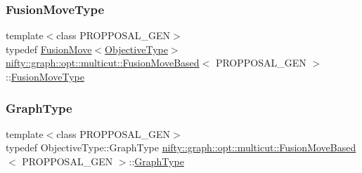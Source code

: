 \mbox{\label{classnifty_1_1graph_1_1opt_1_1multicut_1_1FusionMoveBased_a95a0f97321c6dd76b0986d0a3a26a4cc}} 
\subsubsection{\texorpdfstring{Fusion\+Move\+Type}{FusionMoveType}}
{\footnotesize\ttfamily template$<$class P\+R\+O\+P\+P\+O\+S\+A\+L\+\_\+\+G\+EN$>$ \\
typedef \hyperlink{classnifty_1_1graph_1_1opt_1_1multicut_1_1FusionMove}{Fusion\+Move}$<$\hyperlink{classnifty_1_1graph_1_1opt_1_1multicut_1_1FusionMoveBased_ac860a461dd2c12fd2e67553a4457ee58}{Objective\+Type}$>$ \hyperlink{classnifty_1_1graph_1_1opt_1_1multicut_1_1FusionMoveBased}{nifty\+::graph\+::opt\+::multicut\+::\+Fusion\+Move\+Based}$<$ P\+R\+O\+P\+P\+O\+S\+A\+L\+\_\+\+G\+EN $>$\+::\hyperlink{classnifty_1_1graph_1_1opt_1_1multicut_1_1FusionMoveBased_a95a0f97321c6dd76b0986d0a3a26a4cc}{Fusion\+Move\+Type}}

\mbox{\label{classnifty_1_1graph_1_1opt_1_1multicut_1_1FusionMoveBased_ab3e6f32ad6bad65f1ac4dba8697141b3}} 
\subsubsection{\texorpdfstring{Graph\+Type}{GraphType}}
{\footnotesize\ttfamily template$<$class P\+R\+O\+P\+P\+O\+S\+A\+L\+\_\+\+G\+EN$>$ \\
typedef Objective\+Type\+::\+Graph\+Type \hyperlink{classnifty_1_1graph_1_1opt_1_1multicut_1_1FusionMoveBased}{nifty\+::graph\+::opt\+::multicut\+::\+Fusion\+Move\+Based}$<$ P\+R\+O\+P\+P\+O\+S\+A\+L\+\_\+\+G\+EN $>$\+::\hyperlink{classnifty_1_1graph_1_1opt_1_1multicut_1_1FusionMoveBased_ab3e6f32ad6bad65f1ac4dba8697141b3}{Graph\+Type}}

